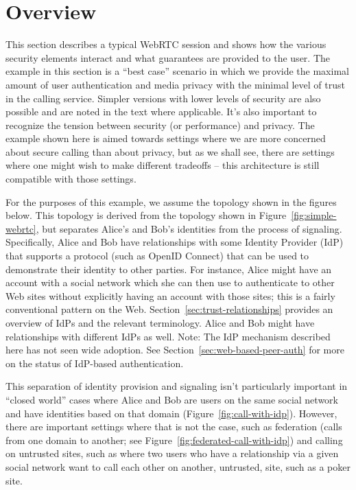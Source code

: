 \documentclass{article}
\begin{document}
\section{Overview}

This section describes a typical WebRTC session and shows how the
various security elements interact and what guarantees are provided
to the user.  The example in this section is a ``best case'' scenario
in which we provide the maximal amount of user authentication and
media privacy with the minimal level of trust in the calling service.
Simpler versions with lower levels of security are also possible and
are noted in the text where applicable.  It's also important to
recognize the tension between security (or performance) and privacy.
The example shown here is aimed towards settings where we are more
concerned about secure calling than about privacy, but as we shall
see, there are settings where one might wish to make different
tradeoffs -- this architecture is still compatible with those
settings.

For the purposes of this example, we assume the topology shown in the
figures below.  This topology is derived from the topology shown in
Figure~\ref{fig:simple-webrtc}, but separates Alice's and Bob's identities from the process
of signaling.  Specifically, Alice and Bob have relationships with
some Identity Provider (IdP) that supports a protocol (such as OpenID
Connect) that can be used to demonstrate their identity to other
parties.  For instance, Alice might have an account with a social
network which she can then use to authenticate to other Web sites
without explicitly having an account with those sites; this is a
fairly conventional pattern on the Web. Section~\ref{sec:trust-relationships} provides an
overview of IdPs and the relevant terminology.  Alice and Bob might
have relationships with different IdPs as well.  Note: The IdP
mechanism described here has not seen wide adoption.  See Section~\ref{sec:web-based-peer-auth}
for more on the status of IdP-based authentication.

This separation of identity provision and signaling isn't
particularly important in ``closed world'' cases where Alice and Bob
are users on the same social network and have identities based on
that domain (Figure~\ref{fig:call-with-idp}).  However, there are important settings where
that is not the case, such as federation (calls from one domain to
another; see Figure~\ref{fig:federated-call-with-idp}) and calling on untrusted sites, such as where
two users who have a relationship via a given social network want to
call each other on another, untrusted, site, such as a poker site.
\end{document}
